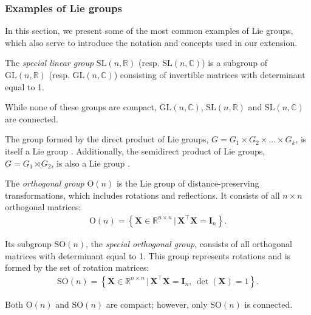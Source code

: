 \subsubsection{Examples of Lie groups}
In this section, we present some of the most common examples of Lie groups, which also serve to introduce the notation and concepts used in our extension.
\begin{example}\label{ex:general-linear-group-special-linear-group}
    The \emph{special linear group} $\text{SL}(n, \mathbb{R})$ (resp. $\text{SL}(n, \mathbb{C})$) is a subgroup of $\text{GL}(n, \mathbb{R})$ (resp. $\text{GL}(n, \mathbb{C})$) consisting of invertible matrices with determinant equal to 1.

    While none of these groups are compact, $\text{GL}(n, \mathbb{C})$, $\text{SL}(n, \mathbb{R})$ and $\text{SL}(n, \mathbb{C})$ are connected.
\end{example}
\begin{example}
    The group formed by the direct product of Lie groups, $G = G_1 \times G_2 \times \dots \times G_k$, is itself a Lie group \citep[p. 152]{Lee2012}. Additionally, the semidirect product of Lie groups, $G = G_1\rtimes G_2$, is also a Lie group \citep[p. 168]{Lee2012}.
\end{example}
\begin{example}\label{ex:orthogonal-group-special-orthogonal-group}
    The \emph{orthogonal group} $\text{O}(n)$ is the Lie group of distance-preserving transformations, which includes rotations and reflections. It consists of all $n\times n$ orthogonal matrices:
    \begin{align}
        \text{O}(n) = \left\{\mathbf{X}\in\mathbb{R}^{n\times n} \,|\, \mathbf{X}^\top\mathbf{X} = \mathbf{I}_n\right\}.
    \end{align}

    Its subgroup $\text{SO}(n)$, the \emph{special orthogonal group}, consists of all orthogonal matrices with determinant equal to 1. This group represents rotations and is formed by the set of rotation matrices:
    \begin{align}
        \text{SO}(n) = \left\{\mathbf{X}\in\mathbb{R}^{n\times n} \,|\, \mathbf{X}^\top\mathbf{X} = \mathbf{I}_n,\, \det(\mathbf{X}) = 1\right\}.
    \end{align}

    Both $\text{O}(n)$ and $\text{SO}(n)$ are compact; however, only $\text{SO}(n)$ is connected.
\end{example}
